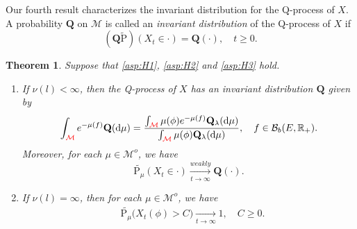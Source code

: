 \documentclass[12pt,a4paper]{amsart}
\numberwithin{equation}{section}
\theoremstyle{plain}
\newtheorem{thm}{Theorem}[section]
\theoremstyle{definition}
\theoremstyle{remark}
\begin{document}
	Our fourth result characterizes the invariant distribution for the Q-process of $X$.
	A probability $\mathbf Q$ on $\mathcal M$ is called an \emph{invariant distribution} of the Q-process of $X$ if
\[
	(\mathbf Q\widetilde{\mathrm P})(X_t \in \cdot )
	=\mathbf Q(\cdot),	\quad t\geq 0.
\]

\begin{thm}\label{thm:I}
	Suppose that \eqref{asp:H1}, \eqref{asp:H2} and \eqref{asp:H3} hold.
\begin{enumerate}
\item
	If $\nu(l)<\infty$, then the Q-process of $X$ has an invariant distribution $\mathbf Q$ given by
\[
	\int_{{\color{red}{\mathcal M}}} e^{-\mu(f)}\mathbf Q(\mathrm d\mu)
	=\frac{\int_{{\color{red}{\mathcal M}}}\mu(\phi)e^{-\mu(f)}\mathbf Q_\lambda({\mathrm d}\mu)} {\int_{{\color{red}{\mathcal M}}}\mu(\phi)\mathbf Q_\lambda({\mathrm d}\mu)}, \quad f\in \mathcal B_b(E, \mathbb R_+).
\]	
Moreover, for each $\mu\in\mathcal M^o$, we have
\[
	\widetilde{\mathrm P_\mu}(X_t \in \cdot )
	\xrightarrow[t\to \infty]{weakly} {\mathbf Q}(\cdot).
\]
\item
	If $\nu(l) = \infty$, then for each $\mu \in \mathcal M^o$, we have
\begin{align}
	& \widetilde{\mathrm P_\mu}\big(X_t(\phi) > C\big)
	\xrightarrow[t\to \infty]{} 1, \quad C\geq 0.
\end{align}
\end{enumerate}
\end{thm}

\end{document}
